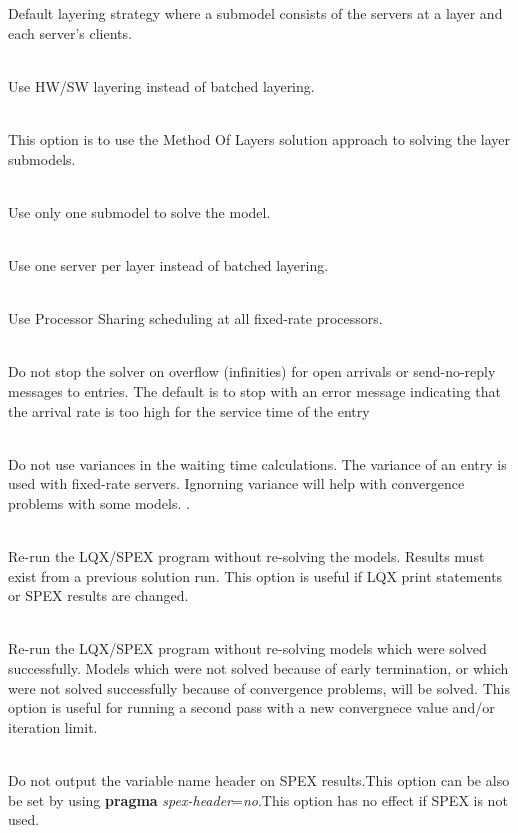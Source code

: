 \begin{description}
Default layering strategy where a submodel consists of the servers at a layer and each server's clients.
\item[\longopt{hwsw-layering}]~\\
Use HW/SW layering instead of batched layering.
\item[\longopt{method-of-layers}]~\\
This option is to use the Method Of Layers solution approach to solving the layer submodels.
\item[\longopt{squashed-layering}]~\\
Use only one submodel to solve the model.
\item[\longopt{srvn-layering}]~\\
Use one server per layer instead of batched layering.
\item[\longopt{processor-sharing}]~\\
Use Processor Sharing scheduling at all fixed-rate processors.
\item[\longopt{no-stop-on-message-loss}]~\\
Do not stop the solver on overflow (infinities) for open arrivals or send-no-reply messages to entries.  The default is to stop with an
error message indicating that the arrival rate is too high for the service time of the entry
\item[\longopt{no-variance}]~\\
Do not use variances in the waiting time calculations.
The variance of an entry is used with fixed-rate servers.
Ignorning variance will help with convergence problems with some models. .
\item[\longopt{reload-lqx}]~\\
Re-run the LQX/SPEX program without re-solving the models.  Results must exist from a previous solution run.
This option is useful if LQX print statements or SPEX results are changed.
\item[\longopt{restart}]~\\
Re-run the LQX/SPEX program without re-solving models which were solved successfully.  Models which were not solved because of early termination, or which were not solved successfully because of convergence problems, will be solved.
This option is useful for running a second pass with a new convergnece value and/or iteration limit.
\item[\longopt{no-header}]~\\
Do not output the variable name header on SPEX results.This option can be also be set by using \textbf{pragma} \emph{spex-header}=\emph{no}.This option has no effect if SPEX is not used.

\end{description}
